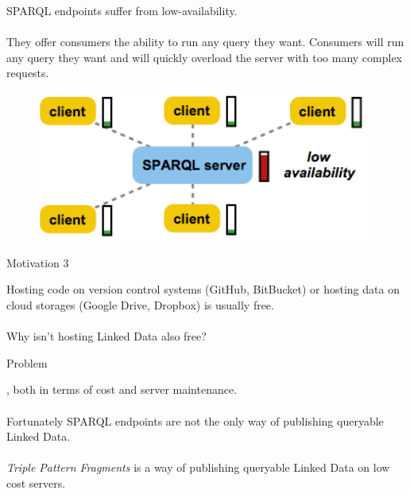 \documentclass[20pt]{extarticle}
\begin{document}
{\fontsize{25}{25} {\cmr 
\noindent SPARQL endpoints {\color{blue}suffer from low-availability.}
\\ \\
They offer consumers the ability to run any query they want. Consumers will run any query they want and will quickly overload the server with too many complex requests.
}
\begin{figure}[ht!]
\centering
\includegraphics[width=110mm]{sparql.png}
\end{figure}



\newpage
 
 
\begin{center}
{\fontsize{35}{35}\color{blue} \sc Motivation 3}
\end{center}

\vspace{10 mm}
{\fontsize{30}{30} {\cmr 
\noindent Hosting code on version control systems (GitHub, BitBucket) or hosting data on cloud storages (Google Drive, Dropbox) is usually {\color{blue} free}.
\\ \\
Why isn't hosting Linked Data also free?
}



\newpage

 \begin{center}
{\fontsize{35}{35}\color{blue} \sc Problem}
\end{center}

\vspace{10 mm}

{\fontsize{30}{30} {\cmr 
{}, both in terms of cost and server maintenance.
\\ \\
Fortunately SPARQL endpoints are not the only way of publishing queryable Linked Data.
\\ \\
\textit{Triple Pattern Fragments} is a way of publishing queryable Linked Data on low cost servers.
}} 

}}
\end{document}
